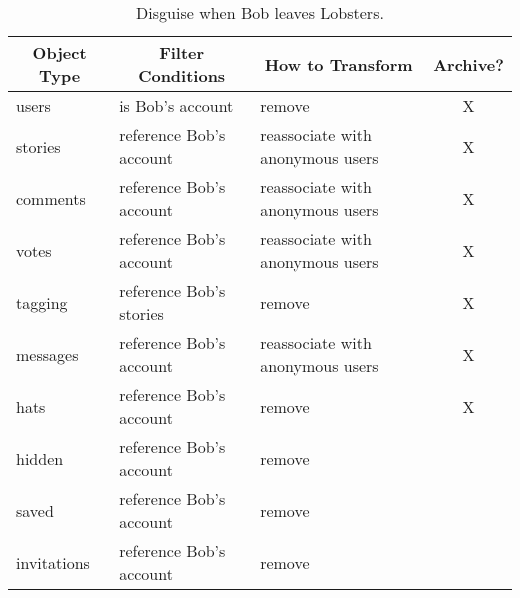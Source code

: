 \begin{table*}[t!]
\begin{tabular}{@{}l|l|l|c@{}}
    \multicolumn{1}{c}{\textbf{Object Type}} & 
    \multicolumn{1}{c}{\textbf{Filter Conditions}} &
    \multicolumn{1}{c}{\textbf{How to Transform}}  &
    \multicolumn{1}{c}{\textbf{Archive?}} \\ 
    \hline
    users & is Bob's account & remove & X\\
    stories & reference Bob's account & reassociate with anonymous users & X\\
    comments & reference Bob's account & reassociate with anonymous users & X\\
    votes & reference Bob's account & reassociate with anonymous users & X\\
    tagging & reference Bob's stories & remove & X \\
    messages & reference Bob's account & reassociate with anonymous users & X \\
    hats & reference Bob's account & remove & X\\
    hidden & reference Bob's account & remove & \\
    saved & reference Bob's account & remove & \\
    invitations & reference Bob's account & remove & \\
\end{tabular}
    \caption{Disguise when Bob leaves Lobsters.}
    \label{tab:lobsters_nuanced}
\end{table*}

